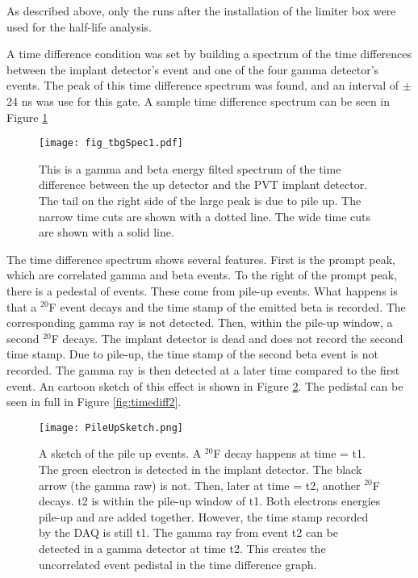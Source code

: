 \documentclass[main.tex]{subfiles}
\begin{document}
As described above, only the runs after the installation of the limiter box were used for the half-life analysis. 

A time difference condition was set by building a spectrum of the time differences between the implant detector's event and one of the four gamma detector's events. 
The peak of this time difference spectrum was found, and an interval of $\pm$24 ns  was use for this gate.
A sample time difference spectrum can be seen in Figure \ref{fig:timediff}

\begin{figure}
	\centerline{\texttt{[image: fig\_tbgSpec1.pdf]}}	
	\caption{This is a gamma and beta energy filted spectrum of the time difference between the up detector and the PVT implant detector.
		The tail on the right side of the large peak is due to pile up.
		The narrow time cuts are shown with a dotted line.
		The wide time cuts are shown with a solid line.}
	\label{fig:timediff}
\end{figure}

The time difference spectrum shows several features.
First is the prompt peak, which are correlated gamma and beta events. 
To the right of the prompt peak, there is a pedestal of events.
These come from pile-up events.
What happens is that a $^{20}$F event decays and the time stamp of the emitted beta is recorded.
The corresponding gamma ray is not detected.
Then, within the pile-up window, a second $^{20}$F decays.  
The implant detector is dead and does not record the second time stamp.
Due to pile-up, the time stamp of the second beta event is not recorded.
The gamma ray is then detected at a later time compared to the first event.
An cartoon sketch of this effect is shown in Figure \ref{fig:PileUp}.
The pedistal can be seen in full in Figure \ref{fig:timediff2}.

\begin{figure}
	\centerline{\texttt{[image: PileUpSketch.png]}}
	\caption{A sketch of the pile up events.
		 A $^{20}$F decay happens at time = t1.
		 The green electron is detected in the implant detector.
		 The black arrow (the gamma raw) is not.
		 Then, later at time = t2, another $^{20}$F decays.
		 t2 is within the pile-up window of t1.
		 Both electrons energies pile-up and are added together.
		 However, the time stamp recorded by the DAQ is still t1.
		 The gamma ray from event t2 can be detected in a gamma detector at time t2.
		 This creates the uncorrelated event pedistal in the time difference graph.
		 }
	\label{fig:PileUp}
\end{figure}
\end{document}
